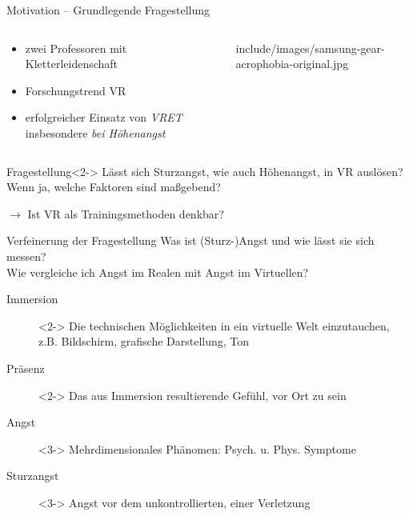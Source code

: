 \begin{frame}{Motivation -- Grundlegende Fragestellung}
\begin{columns}
	\begin{column}{0.48\textwidth}
		\begin{itemize}
			\item zwei Professoren mit Kletterleidenschaft
			\item Forschungstrend \gls{VR}
			\item erfolgreicher Einsatz von \textit{\gls{VRET}} insbesondere \textit{bei Höhenangst} \autocite{Emmelkamp2001}
		\end{itemize}
	\end{column}
	\begin{column}{0.44\textwidth}
		\vfill
		\hfill
		\begin{overpic}[width=0.9\columnwidth]{include/images/samsung-gear-acrophobia-original.jpg}
		\end{overpic}
	\end{column}
\end{columns}
\vfill
{}
\begin{block}{Fragestellung}<2->
	Lässt sich \textcolor{tracker}{Sturzangst}, wie auch Höhenangst, \textcolor{tracker}{in \gls{VR} auslösen?}\\Wenn ja, welche Faktoren sind maßgebend?
	
	\hfill $\rightarrow$ Ist \gls{VR} als Trainingsmethoden denkbar?
\end{block}
\end{frame}

\begin{frame}{Verfeinerung der Fragestellung}
Was ist (Sturz-)Angst und wie lässt sie sich messen?\\Wie vergleiche ich Angst im Realen mit Angst im Virtuellen?
\begin{description}
\item[Immersion]<2-> Die technischen Möglichkeiten in ein virtuelle Welt einzutauchen,\\z.B. Bildschirm, grafische Darstellung, Ton \autocite{McMahan2003}
\item[Präsenz]<2-> Das aus Immersion resultierende Gefühl, vor Ort zu sein \autocite{McMahan2003}
\item[Angst]<3-> Mehrdimensionales Phänomen: Psych. u. Phys. Symptome \autocite{Krohne1996}
\item[Sturzangst]<3-> Angst vor dem unkontrollierten, einer Verletzung \autocite{Lewis2010}
\end{description}
\begin{center}
\end{center}
\end{frame}

